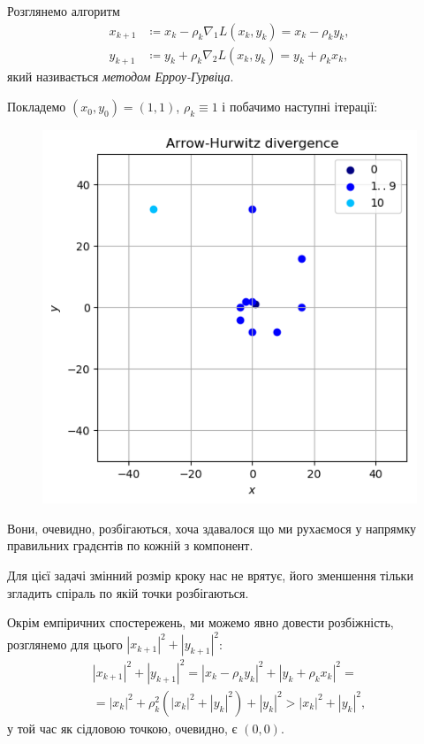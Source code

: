 \begin{solution}
    Розглянемо алгоритм
    \begin{equation}
        \begin{aligned}
            x_{k + 1} &\coloneqq x_k - \rho_k \nabla_1 L(x_k, y_k) = x_k - \rho_k y_k, \\
            y_{k + 1} &\coloneqq y_k + \rho_k \nabla_2 L(x_k, y_k) = y_k + \rho_k x_k,
        \end{aligned}
    \end{equation}
    який називається \textit{методом Ерроу-Гурвіца}. \medskip
    

    Покладемо $(x_0, y_0) = (1, 1)$, $\rho_k \equiv 1$ і побачимо наступні ітерації:
    \begin{figure}[H]
        \centering
        \includegraphics{img/arrow-hurwitz-divergence.png}
    \end{figure}

    Вони, очевидно, розбігаються, хоча здавалося що ми рухаємося у напрямку правильних градєнтів по кожній з компонент.

    \begin{remark}
        Для цієї задачі змінний розмір кроку нас не врятує, його зменшення тільки згладить спіраль по якій точки розбігаються.
    \end{remark}

    Окрім емпіричних спостережень, ми можемо явно довести розбіжність, розглянемо для цього $|x_{k+1}|^2 + |y_{k+1}|^2$:
    \begin{multline}
        |x_{k+1}|^2 + |y_{k+1}|^2 = |x_k - \rho_k y_k|^2 + |y_k + \rho_k x_k|^2 = \\
        = |x_k|^2 + \rho_k^2 \left( |x_k|^2 + |y_k|^2 \right) + |y_k|^2 > |x_k|^2 + |y_k|^2,
    \end{multline}
    у той час як сідловою точкою, очевидно, є $(0, 0)$.
\end{solution}

